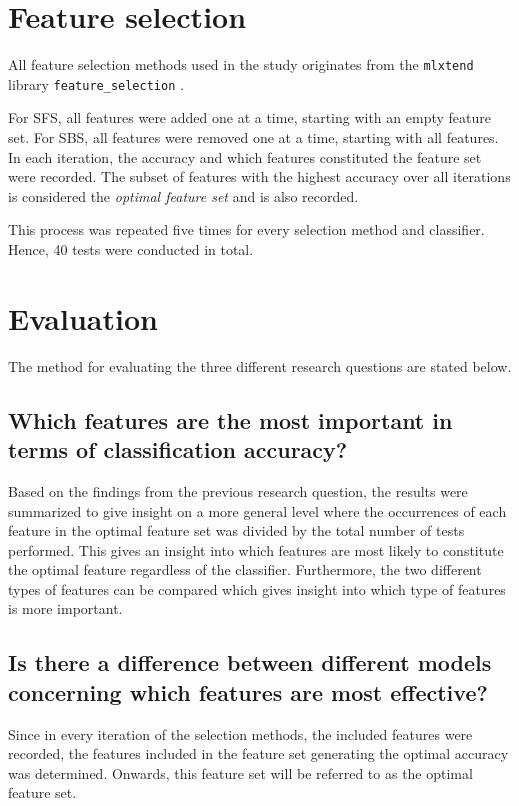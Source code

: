 \documentclass{kththesis}
\begin{document}
\section{Feature selection}

All feature selection methods used in the study originates from the \verb|mlxtend| library \verb|feature_selection| \parencite{raschkas_2018_mlxtend}.

For SFS, all features were added one at a time, starting with an empty feature set. For SBS, all features were removed one at a time, starting with all features. In each iteration, the accuracy and which features constituted the feature set were recorded. The subset of features with the highest accuracy over all iterations is considered the \emph{optimal feature set} and is also recorded.

This process was repeated five times for every selection method and classifier. Hence, 40 tests were conducted in total.


\section{Evaluation}

The method for evaluating the three different research questions are stated below.

\subsection{Which features are the most important in terms of classification accuracy?}
Based on the findings from the previous research question, the results were summarized to give insight on a more general level where the occurrences of each feature in the optimal feature set was divided by the total number of tests performed. This gives an insight into which features are most likely to constitute the optimal feature regardless of the classifier. Furthermore, the two different types of features can be compared which gives insight into which type of features is more important.

\subsection{Is there a difference between different models concerning which features are most effective?}
Since in every iteration of the selection methods, the included features were recorded, the features included in the feature set generating the optimal accuracy was determined. Onwards, this feature set will be referred to as the optimal feature set. 
\end{document}
